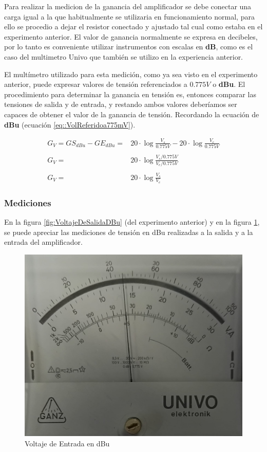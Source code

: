 Para realizar la medicion de la ganancia del amplificador se debe conectar una carga igual a la que habitualmente se utilizaria en funcionamiento normal, para ello se procedio a dejar el resistor conectado y ajustado tal cual como estaba en el experimento anterior. El valor de ganancia normalmente se expresa en decibeles, por lo tanto es conveniente utilizar instrumentos con escalas en \textbf{dB}, como es el caso del multimetro Univo que también se utilizo en la experiencia anterior.

El multímetro utilizado para esta medición, como ya sea visto en el experimento anterior, puede expresar valores de tensión referenciados a $0.775V$ o \textbf{dBu}. El procedimiento para determinar la ganancia en tensión es, entonces comparar las tensiones de salida y de entrada, y restando ambos valores deberíamos ser capaces de obtener el valor de la ganancia de tensión. Recordando la ecuación de \textbf{dBu} (ecuación \ref{eq::VolReferidoa775mV}).

\begin{equation}\label{eq:Exp4RefGv}
\begin{aligned}
    G_V = GS_{dBu}-GE_{dBu}=&20\cdot\log{\frac{V_s}{0.775V}}-20\cdot\log{\frac{V_e}{0.775V}}\\
                    \\
                    G_V =&20\cdot\log{\frac{V_s/0.775V}{V_e/0.775V}}\\
                    \\
                    G_V =&20\cdot\log{\frac{V_s}{V_e}}
\end{aligned}
\end{equation}

\subsubsection{Mediciones}

En la figura \ref{fig:VoltajeDeSalidaDBu} (del experimento anterior) y en la figura \ref{fig:dBuIn}, se puede apreciar las mediciones de tensión en dBu realizadas a la salida y a la entrada del amplificador.

\begin{figure}[H]
    \centering \includegraphics[width=0.5\linewidth]{Imagenes/dBuEnt.jpeg}
    \caption{Voltaje de Entrada en dBu}
    \label{fig:dBuIn}
\end{figure}

